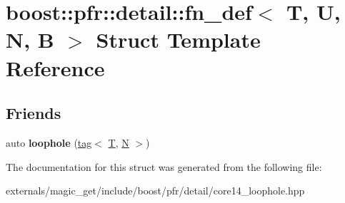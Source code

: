 \hypertarget{structboost_1_1pfr_1_1detail_1_1fn__def}{}\section{boost\+:\+:pfr\+:\+:detail\+:\+:fn\+\_\+def$<$ T, U, N, B $>$ Struct Template Reference}
\label{structboost_1_1pfr_1_1detail_1_1fn__def}
\subsection*{Friends}
\begin{DoxyCompactItemize}
\item 
\mbox{\label{structboost_1_1pfr_1_1detail_1_1fn__def_a96100314a4c088d676b7a5c48e603a2f}} 
auto {\bfseries loophole} (\mbox{\hyperlink{structboost_1_1pfr_1_1detail_1_1tag}{tag}}$<$ \mbox{\hyperlink{struct_t}{T}}, \mbox{\hyperlink{group__types_gaf9c1edb0e0da55ec6ba09f32f6839529}{N}} $>$)
\end{DoxyCompactItemize}


The documentation for this struct was generated from the following file\+:\begin{DoxyCompactItemize}
\item 
externals/magic\+\_\+get/include/boost/pfr/detail/core14\+\_\+loophole.\+hpp\end{DoxyCompactItemize}
